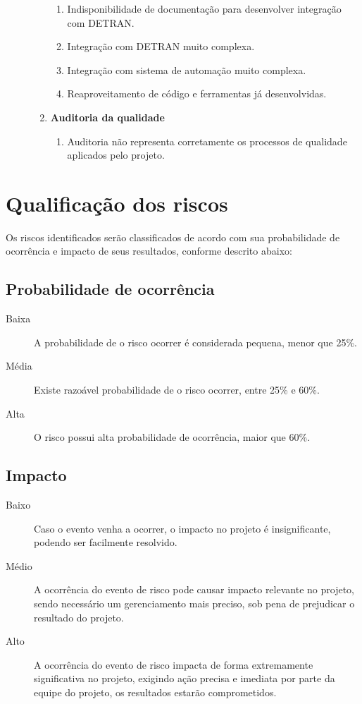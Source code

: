 \begin{description}
\begin{enumerate}[label=\arabic*.]
\begin{enumerate}[label*=\arabic*.]
			      \item Indisponibilidade de documentação para desenvolver integração com DETRAN.
			      \item Integração com DETRAN muito complexa.
			      \item Integração com sistema de automação muito complexa.
			      \item Reaproveitamento de código e ferramentas já desenvolvidas.
		      \end{enumerate}
		\item \textbf{Auditoria da qualidade}
		      \begin{enumerate}[label*=\arabic*.]
			      \item Auditoria não representa corretamente os processos de qualidade aplicados pelo projeto.
		      \end{enumerate}
	\end{enumerate}
\end{description}

\section{Qualificação dos riscos}
\label{sec:risk-qualification}

Os riscos identificados serão classificados de acordo com sua probabilidade de ocorrência e impacto de seus resultados, conforme descrito abaixo:

\subsection{Probabilidade de ocorrência}

\begin{description}
	\item [Baixa] A probabilidade de o risco ocorrer é considerada pequena, menor que 25\%.
	\item [Média] Existe razoável probabilidade de o risco ocorrer, entre 25\% e 60\%.
	\item [Alta] O risco possui alta probabilidade de ocorrência, maior que 60\%.
\end{description}

\subsection{Impacto}

\begin{description}
	\item [Baixo] Caso o evento venha a ocorrer, o impacto no projeto é insignificante, podendo ser facilmente resolvido.
	\item [Médio] A ocorrência do evento de risco pode causar impacto relevante no projeto, sendo necessário um gerenciamento mais preciso, sob pena de prejudicar o resultado do projeto.
	\item [Alto] A ocorrência do evento de risco impacta de forma extremamente significativa no projeto, exigindo ação precisa e imediata por parte da equipe do projeto, os resultados estarão comprometidos.
\end{description}


